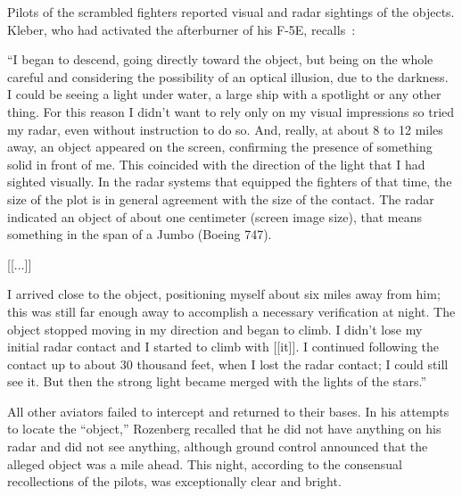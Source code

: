 Pilots of the scrambled fighters reported visual and radar sightings of the objects. Kleber, who had activated the afterburner of his F-5E, recalls~\cite{Brazil86}:
\begin{svgraybox}
``I began to descend, going directly toward the
object, but being on the whole careful and considering the possibility of an optical illusion,
due to the darkness. I could be seeing a light under water, a large ship with a spotlight or any
other thing. For this reason I didn't want to rely only on my visual impressions so tried my
radar, even without instruction to do so. And, really, at about 8 to 12 miles away, an object
appeared on the screen, confirming the presence of something solid in front of me. This
coincided with the direction of the light that I had sighted visually. In the radar systems that
equipped the fighters of that time, the size of the plot is in general agreement with the size of
the contact. The radar indicated an object of about one centimeter (screen image size), that
means something in the span of a Jumbo (Boeing 747).

[[$\ldots$]]

I arrived close to the object, positioning myself about six miles away from him; this was still
far enough away to accomplish a necessary verification at night. The object
stopped moving in my direction and began to climb. I didn't lose my initial radar contact
and I started to climb with [[it]]. I continued following the contact up to about 30 thousand
feet, when I lost the radar contact; I could still see it. But then the strong light became merged
with the lights of the stars.''
\end{svgraybox}

All other aviators failed to intercept and returned to their bases.
In his attempts to locate the ``object,'' Rozenberg recalled that he did not have anything on his radar and did not see anything,
although ground control
announced that the alleged object was a mile ahead.
This night, according to the consensual recollections of the pilots, was exceptionally clear and bright.

